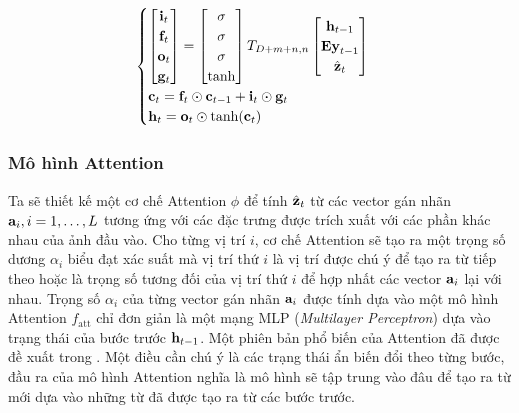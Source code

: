 \documentclass[14pt, a4paper]{article}
\numberwithin{equation}{section}
\numberwithin{algorithm}{section}
\numberwithin{figure}{section}
\numberwithin{table}{section}
\numberwithin{dl}{section}
\numberwithin{md}{section}
\numberwithin{bd}{section}
\numberwithin{dn}{section}
\numberwithin{hq}{section}
\begin{document}
    \begin{equation}
        \begin{cases}
            \begin{bmatrix}
                \bold{i}_t \\
                \bold{f}_t \\
                \bold{o}_t \\
                \bold{g}_t
            \end{bmatrix}=\begin{bmatrix}
                \sigma \\
                \sigma \\
                \sigma \\
                \mathrm{tanh}
            \end{bmatrix}T_{D+m+n,n}\begin{bmatrix}
                \bold{h}_{t-1} \\
                \bold{Ey}_{t-1} \\
                \hat{\bold{z}}_t
            \end{bmatrix} \\
            \bold{c}_t = \bold{f}_t \odot\bold{c}_{t-1} + \bold{i}_t \odot \bold{g}_t \\
            \bold{h}_t = \bold{o}_t \odot \mathrm{tanh}(\bold{c}_t)
        \end{cases}
    \end{equation}

    \subsubsection{Mô hình Attention}

    Ta sẽ thiết kế một cơ chế Attention $\phi$ để tính $\hat{\bold{z}}_t$ từ các vector gán nhãn $\bold{a}_i, i=1, \dots, L$ tương ứng với các đặc trưng được trích xuất với các phần khác nhau của ảnh đầu vào.
    Cho từng vị trí $i$, cơ chế Attention sẽ tạo ra một trọng số dương $\alpha_i$ biểu đạt xác suất mà vị trí thứ $i$ là vị trí được chú ý để tạo ra từ tiếp theo hoặc là trọng số tương đối của vị trí thứ $i$ để hợp nhất các vector $\bold{a}_i$ lại với nhau.
    Trọng số $\alpha_i$ của từng vector gán nhãn $\bold{a}_i$ được tính dựa vào một mô hình Attention $f_{\mathrm{att}}$ chỉ đơn giản là một mạng MLP (\textit{Multilayer Perceptron}) dựa vào trạng thái của bước trước $\bold{h}_{t-1}$.
    Một phiên bản phổ biến của Attention đã được đề xuất trong \cite{bahdanau2014neural}. Một điều cần chú ý là các trạng thái ẩn biến đổi theo từng bước, đầu ra của mô hình Attention nghĩa là mô hình sẽ tập trung vào đâu để tạo ra từ mới dựa vào những từ đã được tạo ra từ các bước trước.
\end{document}
